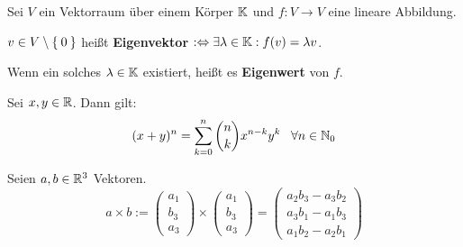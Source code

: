 \begin{definition}%
	Sei $V$ ein Vektorraum über einem Körper $\mathbb{K}$ und $f: V \rightarrow V$ eine
	lineare Abbildung.

	$v \in V \setminus \Set{0}$ heißt \textbf{Eigenvektor} $:\Leftrightarrow \exists \lambda \in \mathbb{K}: f(v) = \lambda v$.

	Wenn ein solches $\lambda \in \mathbb{K}$ existiert, heißt es \textbf{Eigenwert} von $f$.
\end{definition}

\begin{satz*}%
	Sei $x, y \in \mathbb{R}$. Dann gilt:
	\[(x+y)^n = \sum_{k=0}^{n}\binom{n}{k} x^{n-k}y^{k} \;\;\; \forall n \in \mathbb{N}_0\]
\end{satz*}

\begin{definition}
	Seien $a, b \in \mathbb{R}^3$ Vektoren.
	\[ a \times b := \begin{pmatrix}a_1\\b_3\\a_3 \end{pmatrix} \times \begin{pmatrix}a_1\\b_3\\a_3 \end{pmatrix} = \begin{pmatrix}a_2 b_3 - a_3 b_2\\a_3 b_1 - a_1 b_3\\a_1 b_2 - a_2 b_1 \end{pmatrix}\]
\end{definition}